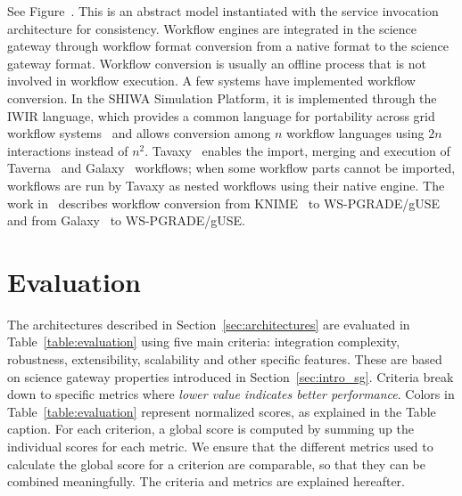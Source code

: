 \documentclass[preprint,3p,twocolumn]{elsarticle}
\begin{document}
See Figure~. This is an abstract model
instantiated with the service invocation architecture for
consistency. Workflow engines are integrated in the science gateway
through workflow format conversion from a native format to the science
gateway format. Workflow conversion
is usually an offline process that is not involved in workflow
execution. A few systems have implemented workflow conversion. In the
SHIWA Simulation Platform, it is implemented through the IWIR
language, which provides a common language for portability across grid
workflow systems~\cite{plankensteiner-prodan-etal:2013} and allows
conversion among $n$ workflow languages using $2n$ interactions
instead of $n^2$.  Tavaxy~\cite{Abouelhoda2012} enables the import,
merging and execution of Taverna~\cite{oinn2004taverna} and
Galaxy~\cite{goecks2010galaxy} workflows; when some workflow parts
cannot be imported, workflows are run by Tavaxy as nested workflows
using their native engine. The work in~\cite{delaGarza2016} describes
workflow conversion from KNIME~\cite{Berthold2008} to WS-PGRADE/gUSE
and from Galaxy~\cite{goecks2010galaxy} to WS-PGRADE/gUSE.


\section{Evaluation}

\label{sec:evaluation}

The architectures described in Section~\ref{sec:architectures} are
evaluated in Table~\ref{table:evaluation} using five main criteria:
integration complexity, robustness, extensibility, scalability and
other specific features. These are based on science gateway properties
introduced in Section~\ref{sec:intro_sg}. Criteria break down to
specific metrics where \emph{lower value indicates better
  performance}. Colors in Table~\ref{table:evaluation} represent
normalized scores, as explained in the Table caption. For each
criterion, a global score is computed by summing up the individual
scores for each metric. We ensure that the different metrics used to
calculate the global score for a criterion are comparable, so that
they can be combined meaningfully. The criteria and metrics are
explained hereafter.
\end{document}
